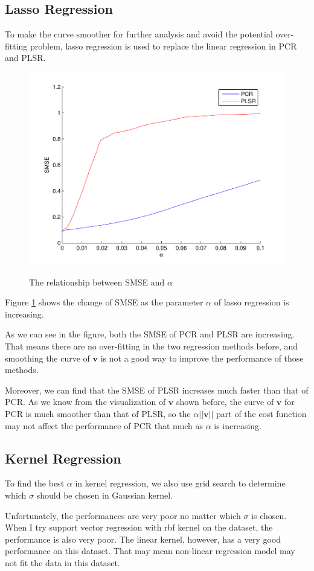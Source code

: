 \documentclass[a4paper]{article}
\newcommand{\bfv}{\mathbf{v}}
\begin{document}
\subsection{Lasso Regression}
To make the curve smoother for further analysis and avoid the potential over-fitting problem, lasso regression is used to replace the linear regression in PCR and PLSR.
\begin{figure}[h]
  \centering
  \includegraphics[width=.6\textwidth]{images/lasso.pdf}\\
  \caption{The relationship between SMSE and $\alpha$}\label{pic8}
\end{figure}

Figure \ref{pic8} shows the change of SMSE as the parameter $\alpha$ of lasso regression is increasing. 

As we can see in the figure, both the SMSE of PCR and PLSR are increasing. That means there are no over-fitting in the two regression methods before, and smoothing the curve of $\bfv$ is not a good way to improve the performance of those methods.

Moreover, we can find that the SMSE of PLSR increases much faster than that of PCR. As we know from the visualization of $\bfv$ shown before, the curve of $\bfv$ for PCR is much smoother than that of PLSR, so the $\alpha ||\bfv||$ part of the cost function may not affect the performance of PCR that much as $\alpha$ is increasing.
\subsection{Kernel Regression}
To find the best $\alpha$ in kernel regression, we also use grid search to determine which $\sigma$ should be chosen in Gaussian kernel.

Unfortunately, the performances are very poor no matter which $\sigma$ is chosen. When I try support vector regression with rbf kernel on the dataset, the performance is also very poor. The linear kernel, however, has a very good performance on this dataset. That may mean non-linear regression model  may not fit the data in this dataset.
\end{document}
